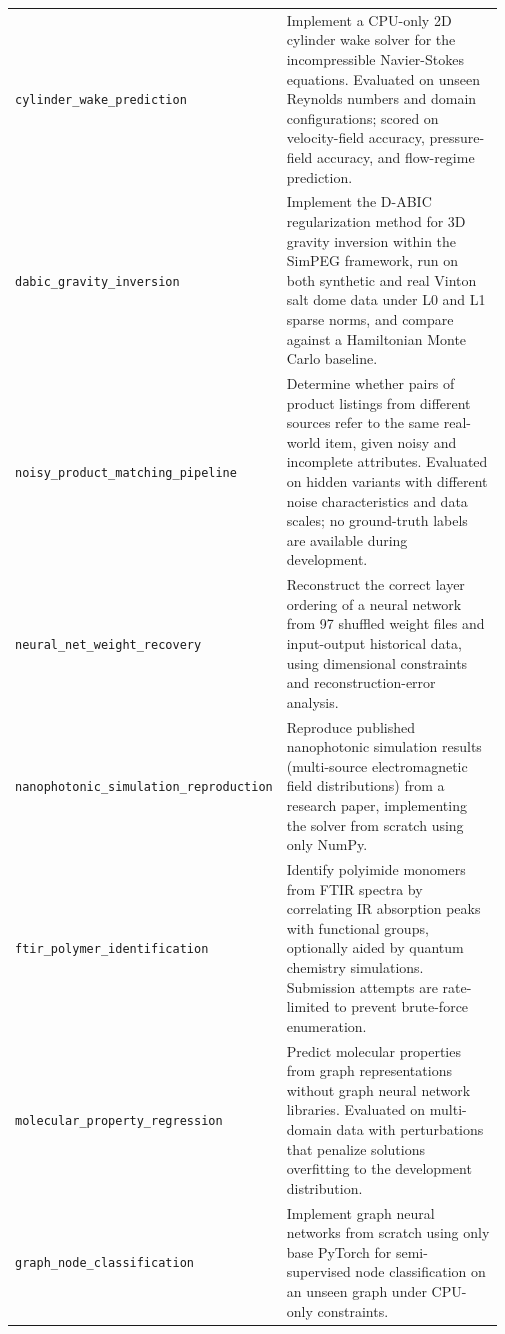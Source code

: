 \begin{longtable}{@{}>{\raggedright\arraybackslash}p{0.20\linewidth}>{\raggedright\arraybackslash}p{0.77\linewidth}@{}}
\tasknoterule
\texttt{cylinder\_\allowbreak{}wake\_\allowbreak{}prediction} & Implement a CPU-only 2D cylinder wake solver for the incompressible Navier-Stokes equations. Evaluated on unseen Reynolds numbers and domain configurations; scored on velocity-field accuracy, pressure-field accuracy, and flow-regime prediction. \\
\tasknoterule
\texttt{dabic\_\allowbreak{}gravity\_\allowbreak{}inversion} & Implement the D-ABIC regularization method for 3D gravity inversion within the SimPEG framework, run on both synthetic and real Vinton salt dome data under L0 and L1 sparse norms, and compare against a Hamiltonian Monte Carlo baseline. \\
\tasknoterule
\texttt{noisy\_\allowbreak{}product\_\allowbreak{}matching\_\allowbreak{}pipeline} & Determine whether pairs of product listings from different sources refer to the same real-world item, given noisy and incomplete attributes. Evaluated on hidden variants with different noise characteristics and data scales; no ground-truth labels are available during development. \\
\tasknoterule
\texttt{neural\_\allowbreak{}net\_\allowbreak{}weight\_\allowbreak{}recovery} & Reconstruct the correct layer ordering of a neural network from 97 shuffled weight files and input-output historical data, using dimensional constraints and reconstruction-error analysis. \\
\tasknoterule
\texttt{nanophotonic\_\allowbreak{}simulation\_\allowbreak{}reproduction} & Reproduce published nanophotonic simulation results (multi-source electromagnetic field distributions) from a research paper, implementing the solver from scratch using only NumPy. \\
\tasknoterule
\texttt{ftir\_\allowbreak{}polymer\_\allowbreak{}identification} & Identify polyimide monomers from FTIR spectra by correlating IR absorption peaks with functional groups, optionally aided by quantum chemistry simulations. Submission attempts are rate-limited to prevent brute-force enumeration. \\
\tasknoterule
\texttt{molecular\_\allowbreak{}property\_\allowbreak{}regression} & Predict molecular properties from graph representations without graph neural network libraries. Evaluated on multi-domain data with perturbations that penalize solutions overfitting to the development distribution. \\
\tasknoterule
\texttt{graph\_\allowbreak{}node\_\allowbreak{}classification} & Implement graph neural networks from scratch using only base PyTorch for semi-supervised node classification on an unseen graph under CPU-only constraints. \\

\end{longtable}
